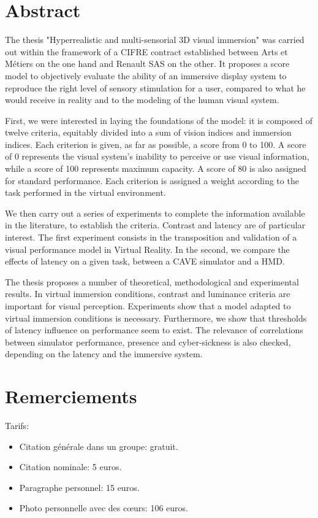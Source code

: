 \chapter*{Abstract}
\par The thesis "Hyperrealistic and multi-sensorial 3D visual immersion" was carried out within the framework of a CIFRE contract established between Arts et Métiers on the one hand and Renault SAS on the other. It proposes a score model to objectively evaluate the ability of an immersive display system to reproduce the right level of sensory stimulation for a user, compared to what he would receive in reality and to the modeling of the human visual system.

\par First, we were interested in laying the foundations of the model: it is composed of twelve criteria, equitably divided into a sum of vision indices and immersion indices. Each criterion is given, as far as possible, a score from 0 to 100. A score of 0 represents the visual system's inability to perceive or use visual information, while a score of 100 represents maximum capacity. A score of 80 is also assigned for standard performance. Each criterion is assigned a weight according to the task performed in the virtual environment.

\par We then carry out a series of experiments to complete the information available in the literature, to establish the criteria. Contrast and latency are of particular interest. The first experiment consists in the transposition and validation of a visual performance model in Virtual Reality. In the second, we compare the effects of latency on a given task, between a CAVE simulator and a HMD.

\par The thesis proposes a number of theoretical, methodological and experimental results. In virtual immersion conditions, contrast and luminance criteria are important for visual perception. Experiments show that a model adapted to virtual immersion conditions is necessary. Furthermore, we show that thresholds of latency influence on performance seem to exist. The relevance of correlations between simulator performance, presence and cyber-sickness is also checked, depending on the latency and the immersive system.

\chapter*{Remerciements}
\par Tarifs:
\begin{itemize}
	\item Citation générale dans un groupe: gratuit.
	\item Citation nominale: 5 euros.
	\item Paragraphe personnel: 15 euros.
	\item Photo personnelle avec des cœurs: 106 euros.
\end{itemize}

